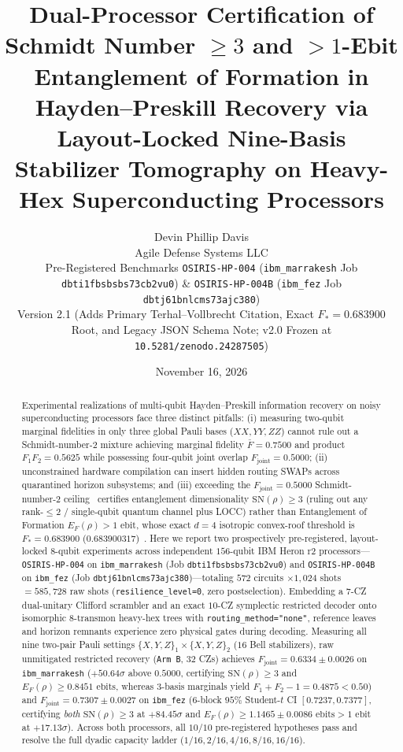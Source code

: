 \documentclass[11pt,twocolumn]{article}
\title{\textbf{Dual-Processor Certification of Schmidt Number $\ge 3$ and $>1$-Ebit Entanglement of Formation in Hayden--Preskill Recovery via Layout-Locked Nine-Basis Stabilizer Tomography on Heavy-Hex Superconducting Processors}}
\author{Devin Phillip Davis\\
\small Agile Defense Systems LLC\\
\small Pre-Registered Benchmarks \texttt{OSIRIS-HP-004} (\texttt{ibm\_marrakesh} Job \texttt{dbti1fbsbsbs73cb2vu0}) \& \texttt{OSIRIS-HP-004B} (\texttt{ibm\_fez} Job \texttt{dbtj61bnlcms73ajc380})\\
\small Version 2.1 (Adds Primary Terhal--Vollbrecht Citation, Exact $F_* = 0.683900$ Root, and Legacy JSON Schema Note; v2.0 Frozen at \texttt{10.5281/zenodo.24287505})}
\date{November 16, 2026}
\begin{document}
\maketitle

\begin{abstract}
Experimental realizations of multi-qubit Hayden--Preskill information recovery on noisy superconducting processors face three distinct pitfalls: (i) measuring two-qubit marginal fidelities in only three global Pauli bases ($XX, YY, ZZ$) cannot rule out a Schmidt-number-$2$ mixture achieving marginal fidelity $\bar{F}=0.7500$ and product $F_1 F_2 = 0.5625$ while possessing four-qubit joint overlap $F_{\mathrm{joint}}=0.5000$; (ii) unconstrained hardware compilation can insert hidden routing SWAPs across quarantined horizon subsystems; and (iii) exceeding the $F_{\mathrm{joint}}=0.5000$ Schmidt-number-$2$ ceiling~\cite{TerhalHorodecki2000} certifies entanglement dimensionality $\mathrm{SN}(\rho)\ge 3$ (ruling out any rank-$\le 2$ / single-qubit quantum channel plus LOCC) rather than Entanglement of Formation $E_F(\rho)>1\text{ ebit}$, whose exact $d=4$ isotropic convex-roof threshold is $F_* = 0.683900$ ($0.683900317$)~\cite{TerhalVollbrecht2000,VollbrechtWerner2001}. Here we report two prospectively pre-registered, layout-locked $8$-qubit experiments across independent $156$-qubit IBM Heron r2 processors---\texttt{OSIRIS-HP-004} on \texttt{ibm\_marrakesh} (Job \texttt{dbti1fbsbsbs73cb2vu0}) and \texttt{OSIRIS-HP-004B} on \texttt{ibm\_fez} (Job \texttt{dbtj61bnlcms73ajc380})---totaling $572$ circuits $\times 1{,}024$ shots $= 585{,}728$ raw shots (\texttt{resilience\_level=0}, zero postselection). Embedding a $7$-CZ dual-unitary Clifford scrambler and an exact $10$-CZ symplectic restricted decoder onto isomorphic $8$-transmon heavy-hex trees with \texttt{routing\_method="none"}, reference leaves and horizon remnants experience zero physical gates during decoding. Measuring all nine two-pair Pauli settings $\{X,Y,Z\}_1\times\{X,Y,Z\}_2$ ($16$ Bell stabilizers), raw unmitigated restricted recovery (\texttt{Arm B}, $32$ CZs) achieves $F_{\mathrm{joint}}=0.6334 \pm 0.0026$ on \texttt{ibm\_marrakesh} ($+50.64\sigma$ above $0.5000$, certifying $\mathrm{SN}(\rho)\ge 3$ and $E_F(\rho)\ge 0.8451\text{ ebits}$, whereas $3$-basis marginals yield $F_1+F_2-1=0.4875<0.50$) and $F_{\mathrm{joint}}=0.7307 \pm 0.0027$ on \texttt{ibm\_fez} ($6$-block $95\%$ Student-$t$ CI $[0.7237, 0.7377]$, certifying \emph{both} $\mathrm{SN}(\rho)\ge 3$ at $+84.45\sigma$ and $E_F(\rho)\ge 1.1465 \pm 0.0086\text{ ebits} > 1\text{ ebit}$ at $+17.13\sigma$). Across both processors, all $10/10$ pre-registered hypotheses pass and resolve the full dyadic capacity ladder ($1/16, 2/16, 4/16, 8/16, 16/16$).
\end{abstract}
\end{document}
